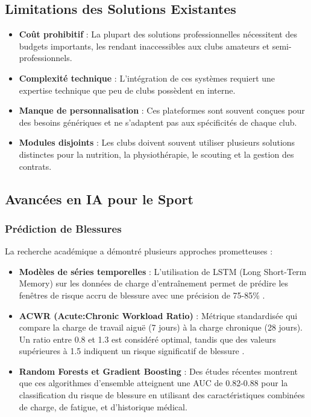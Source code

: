 \subsection{Limitations des Solutions Existantes}

\begin{itemize}
    \item \textbf{Coût prohibitif} : La plupart des solutions professionnelles nécessitent des budgets importants, les rendant inaccessibles aux clubs amateurs et semi-professionnels.
    \item \textbf{Complexité technique} : L'intégration de ces systèmes requiert une expertise technique que peu de clubs possèdent en interne.
    \item \textbf{Manque de personnalisation} : Ces plateformes sont souvent conçues pour des besoins génériques et ne s'adaptent pas aux spécificités de chaque club.
    \item \textbf{Modules disjoints} : Les clubs doivent souvent utiliser plusieurs solutions distinctes pour la nutrition, la physiothérapie, le scouting et la gestion des contrats.
\end{itemize}

\subsection{Avancées en IA pour le Sport}

\subsubsection{Prédiction de Blessures}

La recherche académique a démontré plusieurs approches prometteuses :

\begin{itemize}
    \item \textbf{Modèles de séries temporelles} : L'utilisation de LSTM (Long Short-Term Memory) sur les données de charge d'entraînement permet de prédire les fenêtres de risque accru de blessure avec une précision de 75-85\% \cite{bienefeld2023}.
    
    \item \textbf{ACWR (Acute:Chronic Workload Ratio)} : Métrique standardisée qui compare la charge de travail aiguë (7 jours) à la charge chronique (28 jours). Un ratio entre 0.8 et 1.3 est considéré optimal, tandis que des valeurs supérieures à 1.5 indiquent un risque significatif de blessure \cite{gabbett2016}.
    
    \item \textbf{Random Forests et Gradient Boosting} : Des études récentes montrent que ces algorithmes d'ensemble atteignent une AUC de 0.82-0.88 pour la classification du risque de blessure en utilisant des caractéristiques combinées de charge, de fatigue, et d'historique médical.
\end{itemize}

